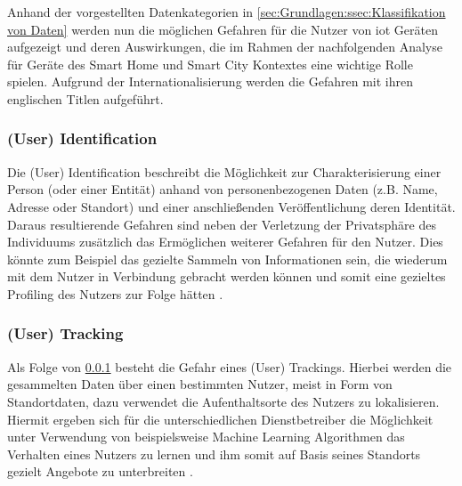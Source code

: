 Anhand der vorgestellten Datenkategorien in \ref{sec:Grundlagen:ssec:Klassifikation von Daten} werden nun die möglichen Gefahren für die Nutzer von \ac{iot} Geräten aufgezeigt und deren Auswirkungen, die im Rahmen der nachfolgenden Analyse für Geräte des Smart Home und Smart City Kontextes eine wichtige Rolle spielen. Aufgrund der Internationalisierung werden die Gefahren mit ihren englischen Titlen aufgeführt.

\subsubsection{(User) Identification}
\label{sec:Grundlagen:ssec:Gefahren für die Privatsphäre:sssec:(User) Identification}

Die (User) Identification beschreibt die Möglichkeit zur Charakterisierung einer Person (oder einer Entität) anhand von personenbezogenen Daten (z.B. Name, Adresse oder Standort) und einer anschließenden Veröffentlichung deren Identität. Daraus resultierende Gefahren sind neben der Verletzung der Privatsphäre des Individuums zusätzlich das Ermöglichen weiterer Gefahren für den Nutzer. Dies könnte zum Beispiel das gezielte Sammeln von Informationen sein, die wiederum mit dem Nutzer in Verbindung gebracht werden können und somit eine gezieltes Profiling des Nutzers zur Folge hätten \cite{Seliem2018}.

\subsubsection{(User) Tracking}
\label{sec:Grundlagen:ssec:Gefahren für die Privatsphäre:sssec:(User) Tracking}

Als Folge von \ref{sec:Grundlagen:ssec:Gefahren für die Privatsphäre:sssec:(User) Identification} besteht die Gefahr eines (User) Trackings. Hierbei werden die gesammelten Daten über einen bestimmten Nutzer, meist in Form von Standortdaten, dazu verwendet die Aufenthaltsorte des Nutzers zu lokalisieren. Hiermit ergeben sich für die unterschiedlichen Dienstbetreiber die Möglichkeit unter Verwendung von beispielsweise Machine Learning Algorithmen das Verhalten eines Nutzers zu lernen und ihm somit auf Basis seines Standorts gezielt Angebote zu unterbreiten \cite{Seliem2018}.

